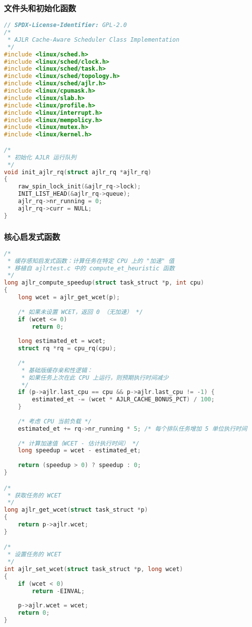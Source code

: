 \documentclass[a4paper,12pt]{article}
\begin{document}
\subsubsection{文件头和初始化函数}

\begin{lstlisting}[language=C]
// SPDX-License-Identifier: GPL-2.0
/*
 * AJLR Cache-Aware Scheduler Class Implementation
 */
#include <linux/sched.h>
#include <linux/sched/clock.h>
#include <linux/sched/task.h>
#include <linux/sched/topology.h>
#include <linux/sched/ajlr.h>
#include <linux/cpumask.h>
#include <linux/slab.h>
#include <linux/profile.h>
#include <linux/interrupt.h>
#include <linux/mempolicy.h>
#include <linux/mutex.h>
#include <linux/kernel.h>

/*
 * 初始化 AJLR 运行队列
 */
void init_ajlr_rq(struct ajlr_rq *ajlr_rq)
{
    raw_spin_lock_init(&ajlr_rq->lock);
    INIT_LIST_HEAD(&ajlr_rq->queue);
    ajlr_rq->nr_running = 0;
    ajlr_rq->curr = NULL;
}
\end{lstlisting}

\subsubsection{核心启发式函数}

\begin{lstlisting}[language=C]
/*
 * 缓存感知启发式函数：计算任务在特定 CPU 上的 "加速" 值
 * 移植自 ajlrtest.c 中的 compute_et_heuristic 函数
 */
long ajlr_compute_speedup(struct task_struct *p, int cpu)
{
    long wcet = ajlr_get_wcet(p);
    
    /* 如果未设置 WCET，返回 0 （无加速） */
    if (wcet <= 0)
        return 0;
    
    long estimated_et = wcet;
    struct rq *rq = cpu_rq(cpu);
    
    /* 
     * 基础版缓存亲和性逻辑：
     * 如果任务上次在此 CPU 上运行，则预期执行时间减少 
     */
    if (p->ajlr.last_cpu == cpu && p->ajlr.last_cpu != -1) {
        estimated_et -= (wcet * AJLR_CACHE_BONUS_PCT) / 100;
    }
    
    /* 考虑 CPU 当前负载 */
    estimated_et += rq->nr_running * 5; /* 每个排队任务增加 5 单位执行时间 */
    
    /* 计算加速值（WCET - 估计执行时间） */
    long speedup = wcet - estimated_et;
    
    return (speedup > 0) ? speedup : 0;
}

/*
 * 获取任务的 WCET
 */
long ajlr_get_wcet(struct task_struct *p)
{
    return p->ajlr.wcet;
}

/*
 * 设置任务的 WCET
 */
int ajlr_set_wcet(struct task_struct *p, long wcet)
{
    if (wcet < 0)
        return -EINVAL;
    
    p->ajlr.wcet = wcet;
    return 0;
}
\end{lstlisting}
\end{document}
